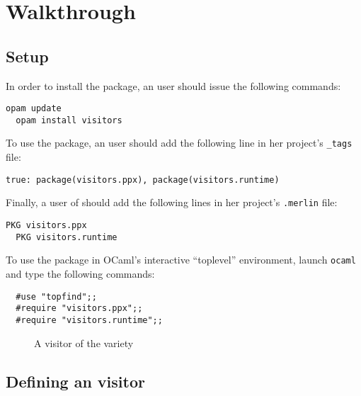 \documentclass[11pt,a4paper,twoside]{article}
\begin{document}

\section{Walkthrough}


\subsection{Setup}
\label{sec:intro:setup}

In order to install the \visitors package, an \opam user should issue the
following commands:
\begin{lstlisting}[keywords={}]
  opam update
  opam install visitors
\end{lstlisting}
To use the package, an \ocamlbuild user should add the
following line in her project's \texttt{\_tags} file:
\begin{lstlisting}[keywords={}]
  true: package(visitors.ppx), package(visitors.runtime)
\end{lstlisting}
Finally, a user of \merlin should add the following lines in her project's
\texttt{.merlin} file:
\begin{lstlisting}[keywords={}]
  PKG visitors.ppx
  PKG visitors.runtime
\end{lstlisting}
To use the \visitors package in OCaml's interactive ``toplevel'' environment,
launch \texttt{ocaml} and type the following commands:
\begin{lstlisting}
  #use "topfind";;
  #require "visitors.ppx";;
  #require "visitors.runtime";;
\end{lstlisting}


\begin{figure}[t]
\vspace{-\baselineskip}
\caption{A visitor of the \iter variety}
\label{fig:expr00}
\end{figure}

\subsection{Defining an \iter visitor}
\label{sec:intro:iter:def}
\end{document}
